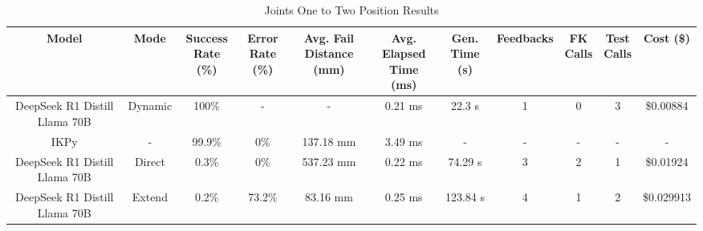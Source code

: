 \begin{landscape}
\begin{table}[H]
\tiny
\renewcommand{\arraystretch}{1.2}
\caption{Joints One to Two Position Results}
\begin{center}
\begin{tabular}{|c|c|c|c|c|c|c|c|c|c|c|}
    \hline
    \textbf{Model} & 
    \textbf{Mode} & 
    \makecell{\textbf{Success}\\\textbf{Rate (\%)}} &
    \makecell{\textbf{Error}\\\textbf{Rate (\%)}} &
    \makecell{\textbf{Avg. Fail}\\\textbf{Distance (mm)}} &
    \makecell{\textbf{Avg. Elapsed}\\\textbf{Time (ms)}} &
    \makecell{\textbf{Gen.}\\\textbf{Time (s)}} &
    \textbf{Feedbacks} &
    \makecell{\textbf{FK}\\\textbf{Calls}} &
    \makecell{\textbf{Test}\\\textbf{Calls}} &
    \textbf{Cost (\$)} \\
    \hline
    DeepSeek R1 Distill Llama 70B & Dynamic & 100\% & - & - & 0.21 ms & 22.3 s & 1 & 0 & 3 & \$0.00884 \\
    \hline
    IKPy & - & 99.9\% & 0\% & 137.18 mm & 3.49 ms & - & - & - & - & - \\
    \hline
    DeepSeek R1 Distill Llama 70B & Direct & 0.3\% & 0\% & 537.23 mm & 0.22 ms & 74.29 s & 3 & 2 & 1 & \$0.01924 \\
    \hline
    DeepSeek R1 Distill Llama 70B & Extend & 0.2\% & 73.2\% & 83.16 mm & 0.25 ms & 123.84 s & 4 & 1 & 2 & \$0.029913 \\
    \hline
\end{tabular}
\label{Results-Position-1-2}
\end{center}
\end{table}


\end{landscape}
